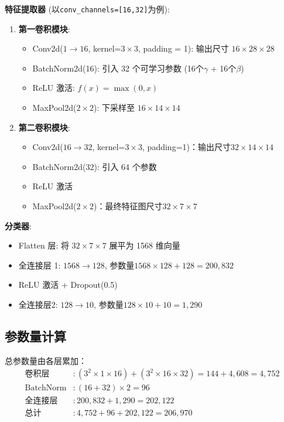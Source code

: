 \documentclass{article}
\begin{document}
			\textbf{特征提取器} (以\texttt{conv\_channels=[16,32]}为例):
			\begin{enumerate}
				\item \textbf{第一卷积模块}:
				\begin{itemize}
					\item Conv2d($1 \to 16$, kernel=$3 \times 3$, padding = 1): 输出尺寸 $16 \times 28 \times 28$
					\item BatchNorm2d(16): 引入 32 个可学习参数 (16个$\gamma$ + 16个$\beta$)
					\item ReLU 激活: $f\left(x\right) = \max\left(0, x\right)$
					\item MaxPool2d($2 \times 2$): 下采样至 $16 \times 14 \times 14$
				\end{itemize}
				
				\item \textbf{第二卷积模块}: 
				\begin{itemize}
					\item Conv2d($16 \to 32$, kernel=$3 \times 3$, padding=1)：输出尺寸$32 \times 14 \times 14$
					\item BatchNorm2d(32): 引入 64 个参数
					\item ReLU 激活
					\item MaxPool2d($2 \times 2$)：最终特征图尺寸$32 \times 7 \times 7$
				\end{itemize}
			\end{enumerate}
			
			\textbf{分类器}:
			\begin{itemize}
				\item Flatten 层: 将 $32 \times 7 \times 7$ 展平为 1568 维向量
				\item 全连接层 1: $1568 \to 128$, 参数量$1568 \times 128 + 128 = 200,832$
				\item ReLU 激活 + Dropout(0.5)
				\item 全连接层2: $128 \to 10$, 参数量$128 \times 10 + 10 = 1,290$
			\end{itemize}
		
		\subsection{参数量计算}
			总参数量由各层累加：
			\begin{equation*}
				\begin{aligned}
					\text{卷积层} & : (3^2\times1\times16) + (3^2\times16\times32) = 144 + 4,608 = 4,752 \\
					\text{BatchNorm} & : (16 + 32)\times2 = 96 \\
					\text{全连接层} & : 200,832 + 1,290 = 202,122 \\
					\hline
					\text{总计} & : 4,752 + 96 + 202,122 = 206,970
				\end{aligned}
			\end{equation*}
		
\end{document}
